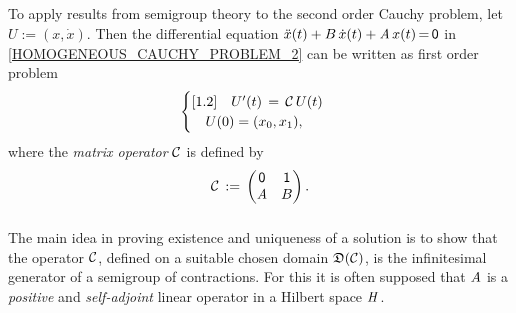 \documentclass[11pt,twoside]{article}
\begin{document}
\subparagraph{} %
To apply results from semigroup theory to the second order Cauchy problem,
let $U := (x,\dot{x})$.
Then the differential equation
$\ddot{x}(t) + \linB \,\dot{x}(t) + \linA \, x(t) \eq \0$
in \eqref{HOMOGENEOUS_CAUCHY_PROBLEM_2}
can be written as first order problem
\begin{equation}\label{TRANSFORMED_SECOND_ORDER_EQUATION}
\begin{cases}[1.2]
\quad U'(t) \= \cal{C} \, U(t) \\
\quad U(0) = (x_0,x_1),\\
\end{cases}
\end{equation}
where the \textit{matrix operator} $\cal{C}$ is defined by
\begin{equation}\label{BLOCK_MATRIX}
\cal{C} \eqdef \begin{pmatrix} \0 & \1 \\ \linA & \linB \end{pmatrix}.
\end{equation}

\subparagraph{} %
The main idea in proving existence and uniqueness of a solution is to show
that
the operator $\cal{C}$,
defined on a suitable chosen domain $\domain{\cal{C}}$,
is the infinitesimal generator of a semigroup of contractions.
For this it is often supposed that
$\linA$ is a \textit{positive} and
\textit{self-adjoint} linear operator in a Hilbert space $\hilH$.

\end{document}
